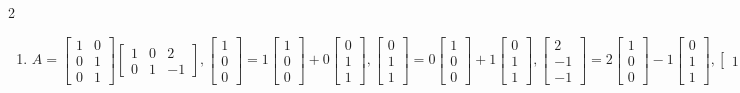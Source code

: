\documentclass[10pt]{amsart}
\begin{document}
\begin{multicols}{2}
\begin{enumerate}


\item 
$A=\begin{bmatrix} 1&0\\0&1\\0&1 \end{bmatrix}\begin{bmatrix} 1&0&2\\0&1&-1 \end{bmatrix},
\begin{bmatrix} 1\\0\\0 \end{bmatrix} = 1\begin{bmatrix} 1\\0\\0 \end{bmatrix}+0\begin{bmatrix} 0\\1\\1 \end{bmatrix},
\begin{bmatrix} 0\\1\\1 \end{bmatrix} = 0\begin{bmatrix} 1\\0\\0 \end{bmatrix}+1\begin{bmatrix} 0\\1\\1 \end{bmatrix},
\begin{bmatrix} 2\\-1\\-1 \end{bmatrix} = 2\begin{bmatrix} 1\\0\\0 \end{bmatrix}-1\begin{bmatrix} 0\\1\\1 \end{bmatrix},
\begin{bmatrix} 1&0&2 \end{bmatrix}=1\begin{bmatrix} 1&0&2 \end{bmatrix}+0\begin{bmatrix} 0&1&-1 \end{bmatrix},
\begin{bmatrix} 0&1&-1 \end{bmatrix}=0\begin{bmatrix} 1&0&2 \end{bmatrix}+1\begin{bmatrix} 0&1&-1 \end{bmatrix},
$


\end{enumerate}
\end{multicols}
\end{document}
